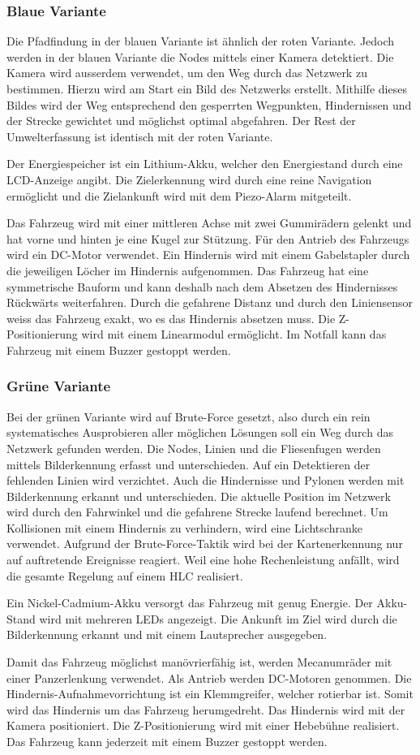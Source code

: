 \documentclass[main.tex]{subfiles} %
\begin{document}
\subsubsection*{Blaue Variante}
Die Pfadfindung in der blauen Variante ist ähnlich der roten Variante. Jedoch
werden in der blauen Variante die Nodes mittels einer Kamera detektiert. Die
Kamera wird ausserdem verwendet, um den Weg durch das Netzwerk zu bestimmen.
Hierzu wird am Start ein Bild des Netzwerks erstellt. Mithilfe dieses Bildes
wird der Weg entsprechend den gesperrten Wegpunkten, Hindernissen und der
Strecke gewichtet und möglichst optimal abgefahren. Der Rest der
Umwelterfassung ist identisch mit der roten Variante.

Der Energiespeicher ist ein Lithium-Akku, welcher den Energiestand durch eine
LCD-Anzeige angibt. Die Zielerkennung wird durch eine reine Navigation
ermöglicht und die Zielankunft wird mit dem Piezo-Alarm mitgeteilt.

Das Fahrzeug wird mit einer mittleren Achse mit zwei Gummirädern gelenkt und
hat vorne und hinten je eine Kugel zur Stützung. Für den Antrieb des Fahrzeugs
wird ein DC-Motor verwendet. Ein Hindernis wird mit einem Gabelstapler durch
die jeweiligen Löcher im Hindernis aufgenommen. Das Fahrzeug hat eine
symmetrische Bauform und kann deshalb nach dem Absetzen des Hindernisses
Rückwärts weiterfahren. Durch die gefahrene Distanz und durch den Liniensensor
weiss das Fahrzeug exakt, wo es das Hindernis absetzen muss. Die
Z-Positionierung wird mit einem Linearmodul ermöglicht. Im Notfall kann das
Fahrzeug mit einem Buzzer gestoppt werden.

\subsubsection*{Grüne Variante}
Bei der grünen Variante wird auf Brute-Force gesetzt, also durch ein rein
systematisches Ausprobieren aller möglichen Lösungen soll ein Weg durch das
Netzwerk gefunden werden. Die Nodes, Linien und die Fliesenfugen werden mittels
Bilderkennung erfasst und unterschieden. Auf ein Detektieren der fehlenden
Linien wird verzichtet. Auch die Hindernisse und Pylonen werden mit
Bilderkennung erkannt und unterschieden. Die aktuelle Position im Netzwerk wird
durch den Fahrwinkel und die gefahrene Strecke laufend berechnet. Um
Kollisionen mit einem Hindernis zu verhindern, wird eine Lichtschranke
verwendet. Aufgrund der Brute-Force-Taktik wird bei der Kartenerkennung nur auf
auftretende Ereignisse reagiert. Weil eine hohe Rechenleistung anfällt, wird
die gesamte Regelung auf einem HLC realisiert.

Ein Nickel-Cadmium-Akku versorgt das Fahrzeug mit genug Energie. Der Akku-Stand
wird mit mehreren LEDs angezeigt. Die Ankunft im Ziel wird durch die
Bilderkennung erkannt und mit einem Lautsprecher ausgegeben.

Damit das Fahrzeug möglichst manövrierfähig ist, werden Mecanumräder mit einer
Panzerlenkung verwendet. Als Antrieb werden DC-Motoren genommen. Die
Hindernis-Aufnahmevorrichtung ist ein Klemmgreifer, welcher rotierbar ist.
Somit wird das Hindernis um das Fahrzeug herumgedreht. Das Hindernis wird mit
der Kamera positioniert. Die Z-Positionierung wird mit einer Hebebühne
realisiert. Das Fahrzeug kann jederzeit mit einem Buzzer gestoppt werden.
\end{document}
